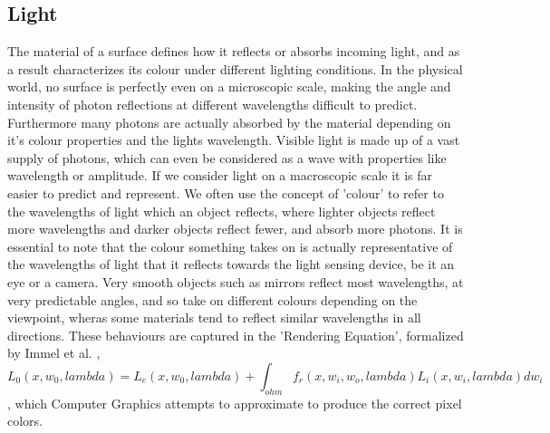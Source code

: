 \documentclass[ %
                    author={Gavin Parker},
                supervisor={Dr. Neill Campbell},
                    degree={MEng},
                     title={Deep Siamese Networks for Illumination Estimation from Stereo Images},
                  subtitle={},
                      type={research},
                      year={2018} ]{dissertation}
\begin{document}
\subsection{Light}
The material of a surface defines how it reflects or absorbs incoming light, and as a result characterizes its colour under different lighting conditions. In the physical world, no surface is perfectly even on a microscopic scale, making the angle and intensity of photon reflections at different wavelengths difficult to predict. Furthermore many photons are actually absorbed by the material depending on it's colour properties and the lights wavelength. Visible light is made up of a vast supply of photons, which can even be considered as a wave with properties like wavelength or amplitude. If we consider light on a macroscopic scale it is far easier to predict and represent. We often use the concept of 'colour' to refer to the wavelengths of light which an object reflects, where lighter objects reflect more wavelengths and darker objects reflect fewer, and absorb more photons. It is essential to note that the colour something takes on is actually representative of the wavelengths of light that it reflects towards the light sensing device, be it an eye or a camera. Very smooth objects such as mirrors reflect most wavelengths, at very predictable angles, and so take on different colours depending on the viewpoint, wheras some materials tend to reflect similar wavelengths in all directions. These behaviours are captured in the 'Rendering Equation', formalized by Immel et al. \cite{Immel:1986:RMN:15886.15901},
\[L_0(x, w_0, lambda) = L_e(x, w_0, lambda) + \int_{ohm}{f_r(x, w_i, w_o,lambda)L_i(x, w_i, lambda)dw_i}\],
which Computer Graphics attempts to approximate to produce the correct pixel colors.
\end{document}
